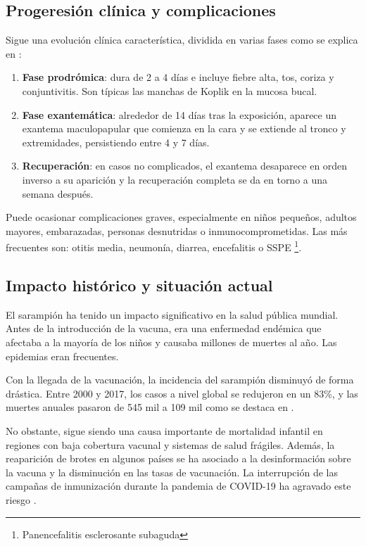 \subsection{Progeresión clínica y complicaciones}
Sigue una evolución clínica característica, dividida en varias fases como se explica en \cite{cdc_measles}:
\begin{enumerate}
    \item \textbf{Fase prodrómica}: dura de 2 a 4 días e incluye fiebre alta, tos, coriza y conjuntivitis. Son típicas las manchas de Koplik en la mucosa bucal.
    \item \textbf{Fase exantemática}: alrededor de 14 días tras la exposición, aparece un exantema maculopapular que comienza en la cara y se extiende al tronco y extremidades, persistiendo entre 4 y 7 días.
    \item \textbf{Recuperación}: en casos no complicados, el exantema desaparece en orden inverso a su aparición y la recuperación completa se da en torno a una semana después.
\end{enumerate}

Puede ocasionar complicaciones graves, especialmente en niños pequeños, adultos mayores, embarazadas, personas desnutridas o inmunocomprometidas. Las más frecuentes son: otitis media, neumonía, diarrea, encefalitis o SSPE \footnote{Panencefalitis esclerosante subaguda}.

\subsection{Impacto histórico y situación actual}
El sarampión ha tenido un impacto significativo en la salud pública mundial. Antes de la introducción de la vacuna, era una enfermedad endémica que afectaba a la mayoría de los niños y causaba millones de muertes al año. Las epidemias eran frecuentes.

Con la llegada de la vacunación, la incidencia del sarampión disminuyó de forma drástica. Entre 2000 y 2017, los casos a nivel global se redujeron en un 83\%, y las muertes anuales pasaron de 545 mil a 109 mil como se destaca en \cite{shanks2014measles}. 

No obstante, sigue siendo una causa importante de mortalidad infantil en regiones con baja cobertura vacunal y sistemas de salud frágiles. Además, la reaparición de brotes en algunos países se ha asociado a la desinformación sobre la vacuna y la disminución en las tasas de vacunación. La interrupción de las campañas de inmunización durante la pandemia de COVID-19 ha agravado este riesgo \cite{fischer2016zinc}.

